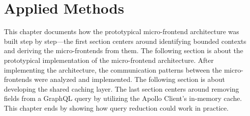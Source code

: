 \chapter{Applied Methods}\label{chapter:applied-methods}

This chapter documents how the prototypical micro-frontend architecture was built step by step—the first section centers around identifying bounded contexts and deriving the micro-frontends from them. The following section is about the prototypical implementation of the micro-frontend architecture. After implementing the architecture, the communication patterns between the micro-frontends were analyzed and implemented. The following section is about developing the shared caching layer. The last section centers around removing fields from a GraphQL query by utilizing the Apollo Client's in-memory cache. This chapter ends by showing how query reduction could work in practice.







